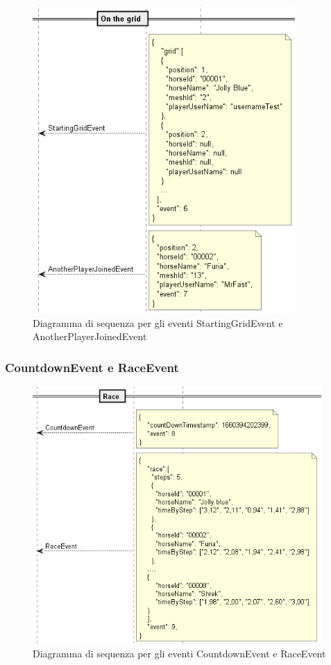         \begin{figure}[!ht]
            \centering
            \includegraphics[width=10cm]{figure/StartingGrid.png}
            \caption{Diagramma di sequenza per gli eventi StartingGridEvent e AnotherPlayerJoinedEvent}
        \end{figure}

        \subsubsection{CountdownEvent e RaceEvent}

        \begin{figure}[!ht]
            \centering
            \includegraphics[width=11cm]{figure/CountdownEvent.png}
            \caption{Diagramma di sequenza per gli eventi CountdownEvent e RaceEvent}
        \end{figure}

